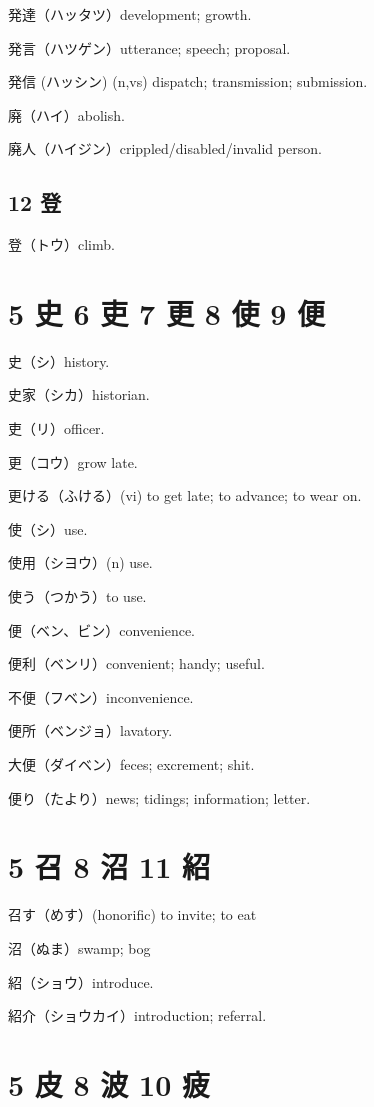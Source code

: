 発達（ハッタツ）development; growth.

発言（ハツゲン）utterance; speech; proposal.

発信 (ハッシン) (n,vs) dispatch; transmission; submission.

廃（ハイ）abolish.

廃人（ハイジン）crippled/disabled/invalid person.

\subsection{12 登}

登（トウ）climb.

\section{5 史 6 吏 7 更 8 使 9 便}

史（シ）history.

史家（シカ）historian.

吏（リ）officer.

更（コウ）grow late.

更ける（ふける）(vi) to get late; to advance; to wear on.

使（シ）use.

使用（シヨウ）(n) use.

使う（つかう）to use.

便（ベン、ビン）convenience.

便利（ベンリ）convenient; handy; useful.

不便（フベン）inconvenience.

便所（ベンジョ）lavatory.

大便（ダイベン）feces; excrement; shit.

便り（たより）news; tidings; information; letter.

\section{5 召 8 沼 11 紹}

召す（めす）(honorific) to invite; to eat

沼（ぬま）swamp; bog

紹（ショウ）introduce.

紹介（ショウカイ）introduction; referral.

\section{5 皮 8 波 10 疲}

